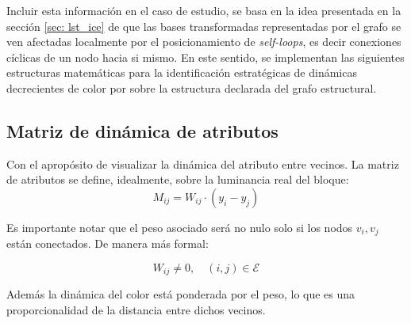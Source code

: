     Incluir esta información en el caso de estudio, se basa en la idea presentada en la sección \ref{sec: lst_ice} de que las bases transformadas representadas por el grafo se ven afectadas localmente por el posicionamiento de \textit{self-loops}, es decir conexiones cíclicas de un nodo hacia si mismo. En este sentido, se implementan las siguientes estructuras matemáticas para la identificación estratégicas de dinámicas decrecientes de color por sobre la estructura declarada del grafo estructural.

    \subsection{Matriz de dinámica de atributos}
        Con el apropósito de visualizar la dinámica del atributo entre vecinos. La matriz de atributos se define, idealmente, sobre la luminancia real del bloque:
        \begin{equation}
            M_{ij} = W_{ij} \cdot (y_i - y_j)
        \end{equation}

        Es importante notar que el peso asociado será no nulo solo si los nodos $v_i,v_j$ están conectados. De manera más formal:

        \begin{equation}
            W_{ij} \neq 0, \quad (i,j) \in \mathcal{E}
        \end{equation}

        Además la dinámica del color está ponderada por el peso, lo que es una proporcionalidad de la distancia entre dichos vecinos.

